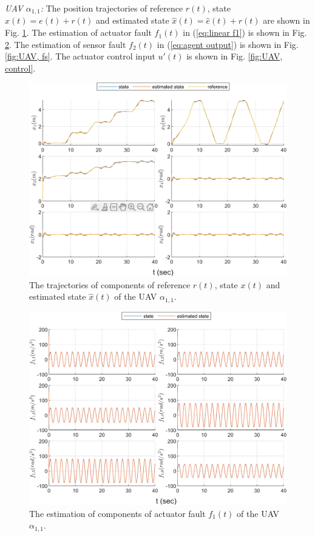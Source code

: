 \documentclass[journal,12pt,onecolumn,draftclsnofoot,]{IEEEtran}
\begin{document}
\textit{UAV $\alpha_{1,1}$:}
The position trajectories of reference $r(t)$, state $x(t) = e(t) + r(t)$ and estimated state $\hat{x}(t) = \hat{e}(t) + r(t)$ are shown in Fig. \ref{fig:UAV, state}. The estimation of actuator fault $f_1(t)$ in (\ref{eq:linear f1}) is shown in Fig. \ref{fig:UAV, fa}. The estimation of sensor fault $f_2(t)$ in (\ref{eq:agent output}) is shown in Fig. \ref{fig:UAV, fs}. The actuator control input $u'(t)$ is shown in Fig. \ref{fig:UAV, control}.
\begin{figure}[htbp]
    \centering
    \includegraphics[scale=.57]{fig/uav (1).png}\caption{The trajectories of components of reference $r(t)$, state $x(t)$ and estimated state $\hat{x}(t)$ of the UAV $\alpha_{1,1}$.}%
    \label{fig:UAV, state}
\end{figure}
\begin{figure}[htbp]
    \centering
    \includegraphics[scale=.57]{fig/uav (2).png}\caption{The estimation of components of actuator fault $f_1(t)$ of the UAV $\alpha_{1,1}$.}
    \label{fig:UAV, fa}
\end{figure}
\end{document}
